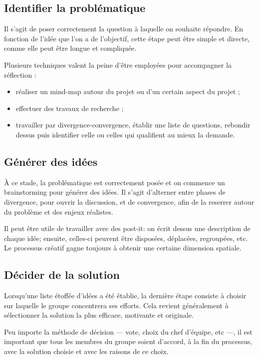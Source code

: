 \documentclass[a4paper,12pt, oneside]{article}
\begin{document}
\subsection{Identifier la problématique}

Il s'agit de poser correctement la question à laquelle on souhaite répondre. En fonction de l'idée que l'on a de l'objectif, cette étape peut être simple et directe, comme elle peut être longue et compliquée.

Plusieurs techniques valent la peine d'être employées pour accompagner la réflection :
\begin{itemize}
    \item réaliser un mind-map autour du projet ou d'un certain aspect du projet ;
    \item effectuer des travaux de recherche ;
    \item travailler par divergence-convergence, établir une liste de questions, rebondir dessus puis identifier celle ou celles qui qualifient au mieux la demande.
\end{itemize}

\subsection{Générer des idées}

À ce stade, la problématique est correctement posée et on commence un brainstorming pour générer des idées. Il s'agit d'alterner entre phases de divergence, pour ouvrir la discussion, et de convergence, afin de la reserrer autour du problème et des enjeux réalistes.

Il peut être utile de travailler avec des post-it: on écrit dessus une description de chaque idée; ensuite, celles-ci peuvent être disposées, déplacées, regroupées, etc. Le processus créatif gagne toujours à obtenir une certaine dimension spatiale.

\subsection{Décider de la solution}

Lorsqu'une liste étoffée d'idées a été établie, la dernière étape consiste à choisir sur laquelle le groupe concentrera ses efforts. Cela revient généralement à sélectionner la solution la plus efficace, motivante et originale.

Peu importe la méthode de décision --- vote, choix du chef d'équipe, etc ---, il est important que tous les membres du groupe soient d'accord, à la fin du processus, avec la solution choisie et avec les raisons de ce choix.
\end{document}
